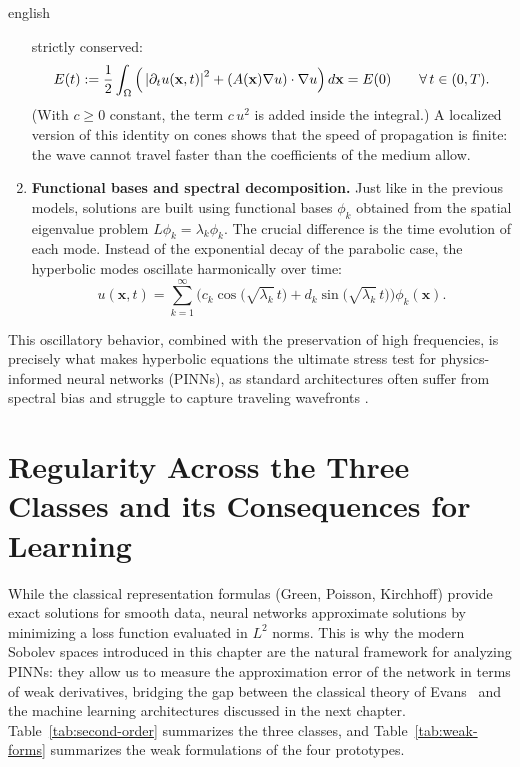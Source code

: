 \documentclass[0000.tex]{subfiles}
\begin{document}
\begin{hyphenrules}{english}
\begin{enumerate}
    strictly conserved:
    \begin{equation}
      E(t):=\frac12\int_\Omega\Big(\abs{\partial_t u(\mathbf{x},t)}^2+(A(\mathbf{x})\nabla u)\cdot\nabla u\Big)\,d\mathbf{x}=E(0)
      \qquad\forall\,t\in(0,T).
      \label{eq:energy-conservation}
    \end{equation}
    (With $c\ge0$ constant, the term $c\,u^2$ is added inside the integral.) A localized version of
    this identity on cones shows that the speed of propagation is finite: the wave cannot travel faster
    than the coefficients of the medium allow.
  \item \textbf{Functional bases and spectral decomposition.} Just like in the previous models,
    solutions are built using functional bases $\phi_k$ obtained from the spatial eigenvalue problem
    $L\phi_k=\lambda_k\phi_k$. The crucial difference is the time evolution of each mode. Instead of
    the exponential decay of the parabolic case, the hyperbolic modes oscillate harmonically over time:
    \begin{equation}
      u(\mathbf{x},t)=\sum_{k=1}^{\infty}\Big(c_k\cos\big(\sqrt{\lambda_k}\,t\big)+d_k\sin\big(\sqrt{\lambda_k}\,t\big)\Big)\phi_k(\mathbf{x}).
      \label{eq:hyperbolic-modes}
    \end{equation}
\end{enumerate}
This oscillatory behavior, combined with the preservation of high frequencies, is precisely what makes
hyperbolic equations the ultimate stress test for physics-informed neural networks (PINNs), as standard
architectures often suffer from spectral bias and struggle to capture traveling wavefronts
\cite{wang2021eigenvector,wang2022ntk}.

\section[Regularity and its Consequences for Learning]{Regularity Across the Three Classes and its Consequences for Learning}\label{sec:regularity-bridge}

While the classical representation formulas (Green, Poisson, Kirchhoff) provide exact solutions for
smooth data, neural networks approximate solutions by minimizing a loss function evaluated in $L^2$
norms. This is why the modern Sobolev spaces introduced in this chapter are the natural framework for
analyzing PINNs: they allow us to measure the approximation error of the network in terms of weak
derivatives, bridging the gap between the classical theory of Evans~\cite{evans2010} and the machine
learning architectures discussed in the next chapter. Table~\ref{tab:second-order} summarizes the three
classes, and Table~\ref{tab:weak-forms} summarizes the weak formulations of the four prototypes.


\end{hyphenrules}
\end{document}
